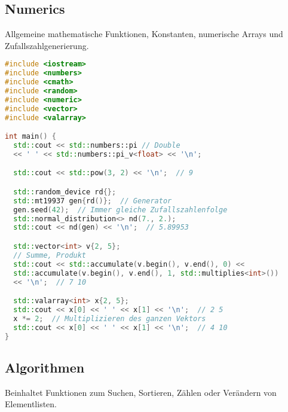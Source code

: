 \subsection{Numerics}

Allgemeine mathematische Funktionen, Konstanten, numerische Arrays und
Zufallszahlgenerierung.

\begin{lstlisting}[language=C++]
#include <iostream>
#include <numbers>
#include <cmath>
#include <random>
#include <numeric>
#include <vector>
#include <valarray>

int main() {
  std::cout << std::numbers::pi // Double
  << ' ' << std::numbers::pi_v<float> << '\n';

  std::cout << std::pow(3, 2) << '\n';  // 9

  std::random_device rd{};
  std::mt19937 gen{rd()};  // Generator
  gen.seed(42);  // Immer gleiche Zufallszahlenfolge
  std::normal_distribution<> nd(7., 2.);
  std::cout << nd(gen) << '\n';  // 5.89953

  std::vector<int> v{2, 5};
  // Summe, Produkt
  std::cout << std::accumulate(v.begin(), v.end(), 0) <<
  std::accumulate(v.begin(), v.end(), 1, std::multiplies<int>())
  << '\n';  // 7 10

  std::valarray<int> x{2, 5};
  std::cout << x[0] << ' ' << x[1] << '\n';  // 2 5
  x *= 2;  // Multiplizieren des ganzen Vektors
  std::cout << x[0] << ' ' << x[1] << '\n';  // 4 10
}
\end{lstlisting}

\subsection{Algorithmen}

Beinhaltet Funktionen zum Suchen, Sortieren, Zählen oder Verändern von
Elementlisten.

